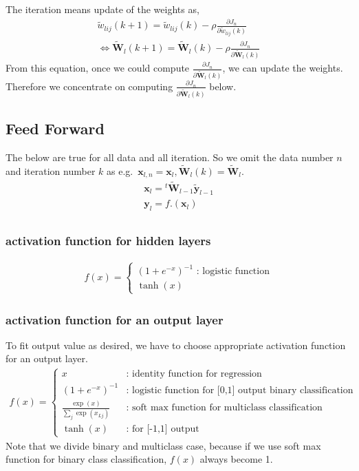 \documentclass{article}
\begin{document}
The iteration means update of the weights as,
\begin{eqnarray}
  \tilde{w}_{lij}(k+1) 
  = \tilde{w}_{lij}(k) - \rho \frac{\partial J_n}{\partial
    \tilde{w}_{lij}(k)} \\
 \iff \bm{\tilde{W}}_l(k+1) 
  = \bm{\tilde{W}}_{l}(k) - \rho \frac{\partial J_n}{\partial
    \bm{\tilde{W}}_{l}(k)} \label{eq:weight_update}
\end{eqnarray}
From this equation, once we could compute $\frac{\partial J_n}{\partial
  \bm{\tilde{W}}_{l}(k)}$, we can update the weights.
Therefore we concentrate on computing $\frac{\partial J_n}{\partial
  \bm{\tilde{W}}_{l}(k)}$ below.

\subsection{Feed Forward}
The below are true for all data and all iteration.
So we omit the data number $n$ and iteration number $k$ as 
e.g.\ $\bm{x}_{l,n} = \bm{x}_l, \bm{\tilde{W}}_l(k) = \bm{\tilde{W}}_l$.
\begin{eqnarray}
  \bm{x}_l = {}^t\bm{\tilde{W}}_{l-1} \bm{\tilde{y}}_{l-1} \\
  \bm{y}_l = f.(\bm{x}_l) \\
\end{eqnarray}

\subsubsection{activation function for hidden layers}
\begin{eqnarray}
  f(x) = 
  \begin{cases}
    (1+e^{-x})^{-1} \mbox{ : logistic function}\\
    \tanh(x) 
  \end{cases} \label{eq:activation hidden}
\end{eqnarray}

\subsubsection{activation function for an output layer}
To fit output value as desired, we have to choose appropriate activation
function for an output layer.
\begin{eqnarray}
  f(x) = 
  \begin{cases}
    x &\mbox{: identity function for regression}\\
    (1+e^{-x})^{-1} &\mbox{: logistic function for [0,1] output binary
    classification}\\
  \frac{\exp(x)}{\sum_j \exp(x_{Lj})} &\mbox{: soft max function for multiclass
  classification}\\
    \tanh(x) &\mbox{: for [-1,1] output}
  \end{cases} \label{eq:activation out}
\end{eqnarray}
Note that we divide binary and multiclass case, because if we use soft
max function for binary class classification, $f(x)$ always become 1.
\end{document}
